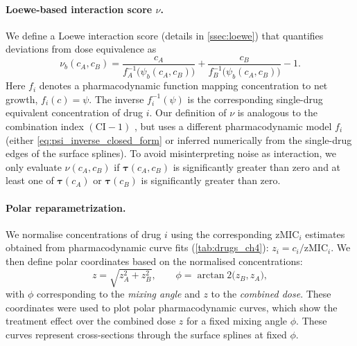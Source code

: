 \paragraph{Loewe-based interaction score \(\nu\).}
We define a Loewe interaction score (details in \autoref{ssec:loewe}) that quantifies deviations from dose equivalence as
\begin{equation}
  \nu_b(c_A,c_B)
  =
  \frac{c_A}{f_A^{-1}\!\big(\psi_b(c_A,c_B)\big)}
  +
  \frac{c_B}{f_B^{-1}\!\big(\psi_b(c_A,c_B)\big)}
  -1.
  \label{eq:fici}
\end{equation}
Here \(f_i\) denotes a pharmacodynamic function mapping concentration to net growth, \(f_i(c)=\psi\).
The inverse \(f_i^{-1}(\psi)\) is the corresponding single-drug equivalent concentration of drug \(i\).
Our definition of \(\nu\) is analogous to the combination index \((\mathrm{CI}-1)\) \cite{Chou1984}, but uses a different pharmacodynamic model \(f_i\) (either \autoref{eq:psi_inverse_closed_form} or inferred numerically from the single-drug edges of the surface splines).
To avoid misinterpreting noise as interaction, we only evaluate \(\nu(c_A,c_B)\) if \(\symbf{\tau}(c_A,c_B)\) is significantly greater than zero and at least one of \(\symbf{\tau}(c_A)\) or \(\symbf{\tau}(c_B)\) is significantly greater than zero.

\paragraph{Polar reparametrization.}
We normalise concentrations of drug \(i\) using the corresponding \(\mathrm{zMIC}_i\) estimates obtained from pharmacodynamic curve fits (\autoref{tab:drugs_ch4}): \(z_i=c_i/\mathrm{zMIC}_i\).
We then define polar coordinates based on the normalised concentrations:
\begin{equation}
  z=\sqrt{z_{A}^{2}+z_{B}^{2}},
  \qquad
  \phi=\arctan2\!\bigl(z_{B},z_{A}\bigr),
  \label{eq:polar_coordinates}
\end{equation}
with \(\phi\) corresponding to the \emph{mixing angle} and \(z\) to the \emph{combined dose}.
These coordinates were used to plot polar pharmacodynamic curves, which show the treatment effect over the combined dose \(z\) for a fixed mixing angle \(\phi\).
These curves represent cross-sections through the surface splines at fixed \(\phi\).


